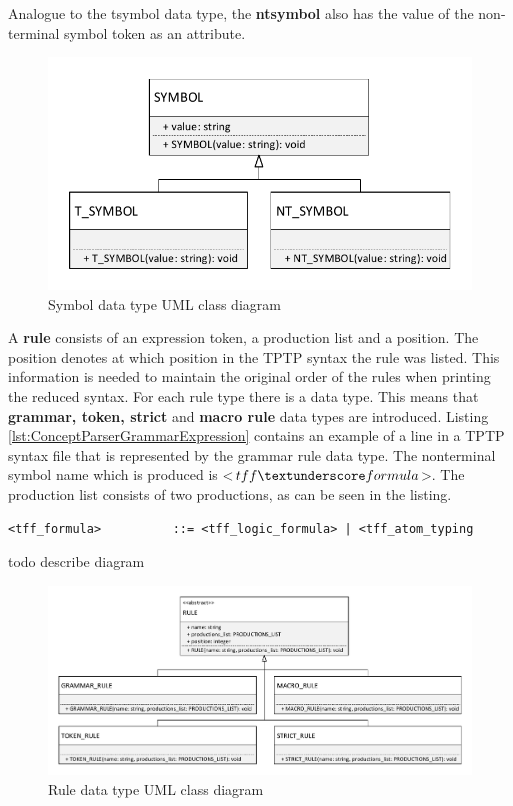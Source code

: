 Analogue to the t\textunderscore symbol data type, the \textbf{nt\textunderscore  symbol} also has the value of the non-terminal symbol token as an attribute. 

\begin{figure}[H]
\centering
\includegraphics[width=.8\textwidth]{images/Concept_uml_data_types_symbols.pdf}
\caption{Symbol data type UML class diagram}
\label{fig:ConceptSymbolsClassDiagram}
\end{figure}

A \textbf{rule} consists of an expression token, a production list and a position.
The position denotes at which position in the TPTP syntax the rule was listed.
This information is needed to maintain the original order of the rules when printing the reduced syntax.
For each rule type there is a data type.
This means that \textbf{grammar, token, strict} and \textbf{macro rule} data types are introduced.
Listing \ref{lst:ConceptParserGrammarExpression} contains an example of a line in a \ac{TPTP} syntax file that is represented by the grammar rule data type.
The nonterminal symbol name which is produced is <$tff \textunderscore formula$>.  The production list consists of two productions, as can be seen in the listing.
\begin{lstlisting}[basicstyle=\scriptsize	,caption= Grammar expression,label= lst:ConceptParserGrammarExpression]
<tff_formula>          ::= <tff_logic_formula> | <tff_atom_typing
\end{lstlisting}


todo describe diagram
\begin{figure}[H]
\centering
\includegraphics[width=1\textwidth]{images/Concept_uml_data_types_rules.pdf}
\caption{Rule data type UML class diagram}
\label{fig:ConceptRulesClassDiagram}
\end{figure}

